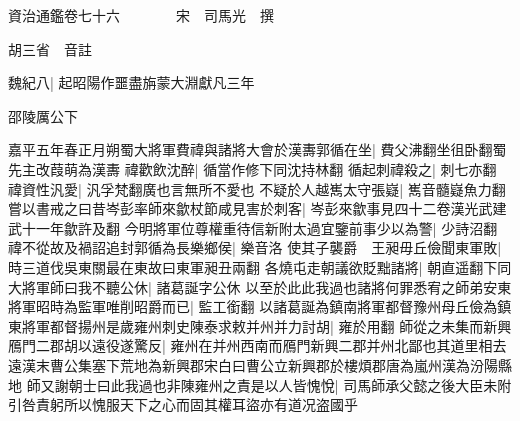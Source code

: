






























































資治通鑑卷七十六　　　　宋　司馬光　撰

胡三省　音註

魏紀八|{
	起昭陽作噩盡旃蒙大淵獻凡三年}


邵陵厲公下

嘉平五年春正月朔蜀大將軍費禕與諸將大會於漢夀郭循在坐|{
	費父沸翻坐徂卧翻蜀先主改葭萌為漢夀}
禕歡飲沈醉|{
	循當作修下同沈持林翻}
循起刺禕殺之|{
	刺七亦翻}
禕資性汎愛|{
	汎孚梵翻廣也言無所不愛也}
不疑於人越嶲太守張嶷|{
	嶲音髓嶷魚力翻}
嘗以書戒之曰昔岑彭率師來歙杖節咸見害於刺客|{
	岑彭來歙事見四十二卷漢光武建武十一年歙許及翻}
今明將軍位尊權重待信新附太過宜鑒前事少以為警|{
	少詩沼翻}
禕不從故及禍詔追封郭循為長樂鄉侯|{
	樂音洛}
使其子襲爵　王昶毋丘儉聞東軍敗|{
	時三道伐吳東關最在東故曰東軍昶丑兩翻}
各燒屯走朝議欲貶黜諸將|{
	朝直遥翻下同}
大將軍師曰我不聽公休|{
	諸葛誕字公休}
以至於此此我過也諸將何罪悉宥之師弟安東將軍昭時為監軍唯削昭爵而已|{
	監工銜翻}
以諸葛誕為鎮南將軍都督豫州母丘儉為鎮東將軍都督揚州是歲雍州刺史陳泰求敕并州并力討胡|{
	雍於用翻}
師從之未集而新興鴈門二郡胡以遠役遂驚反|{
	雍州在并州西南而鴈門新興二郡并州北鄙也其道里相去遠漢末曹公集塞下荒地為新興郡宋白曰曹公立新興郡於樓煩郡唐為嵐州漢為汾陽縣地}
師又謝朝士曰此我過也非陳雍州之責是以人皆愧悅|{
	司馬師承父懿之後大臣未附引咎責躬所以愧服天下之心而固其權耳盜亦有道况盗國乎}


